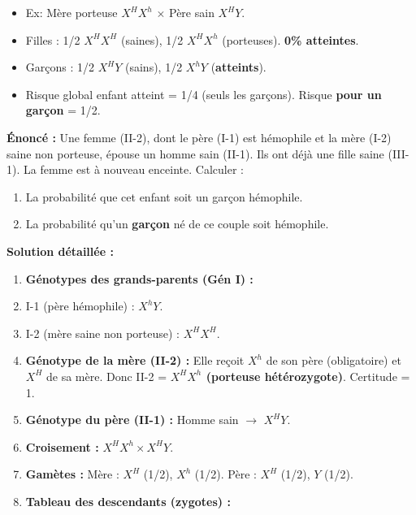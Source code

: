 \documentclass[11pt]{article}
\begin{document}
\begin{methode}
\begin{enumerate}
              \begin{itemize}
                  \item Ex: Mère porteuse $X^H X^h$ $\times$ Père sain $X^H Y$.
                  \item Filles : 1/2 $X^H X^H$ (saines), 1/2 $X^H X^h$ (porteuses). \textbf{0\% atteintes}.
                  \item Garçons : 1/2 $X^H Y$ (sains), 1/2 $X^h Y$ (\textbf{atteints}).
                  \item Risque global enfant atteint = 1/4 (seuls les garçons). Risque \textbf{pour un garçon} = 1/2.
              \end{itemize}
    \end{enumerate}
\end{methode}

\begin{exoresolu}
    \textbf{Énoncé :} Une femme (II-2), dont le père (I-1) est hémophile et la mère (I-2) saine non porteuse, épouse un homme sain (II-1). Ils ont déjà une fille saine (III-1). La femme est à nouveau enceinte. Calculer :
    \begin{enumerate}
        \item La probabilité que cet enfant soit un garçon hémophile.
        \item La probabilité qu'un \textbf{garçon} né de ce couple soit hémophile.
    \end{enumerate}
    \tcblower
    \textbf{Solution détaillée :}
    \begin{enumerate}
        \item \textbf{Génotypes des grands-parents (Gén I) :}
              \item I-1 (père hémophile) : $X^h Y$.
              \item I-2 (mère saine non porteuse) : $X^H X^H$.
        \item \textbf{Génotype de la mère (II-2) :} Elle reçoit $X^h$ de son père (obligatoire) et $X^H$ de sa mère. Donc II-2 = \textbf{$X^H X^h$ (porteuse hétérozygote)}. Certitude = 1.
        \item \textbf{Génotype du père (II-1) :} Homme sain $\rightarrow$ $X^H Y$.
        \item \textbf{Croisement :} $X^H X^h \times X^H Y$.
        \item \textbf{Gamètes :} Mère : $X^H$ (1/2), $X^h$ (1/2). Père : $X^H$ (1/2), $Y$ (1/2).
        \item \textbf{Tableau des descendants (zygotes) :}

\end{enumerate}
\end{exoresolu}
\end{document}
